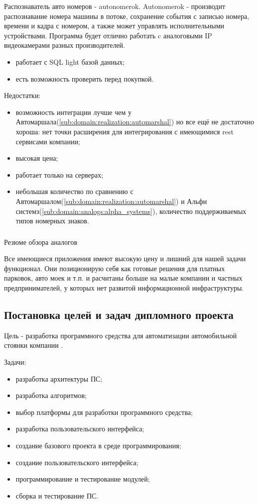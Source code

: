 Распознаватель авто номеров - autonomerok. Autonomerok - производит распознавание номера машины в потоке, сохранение события с записью номера, времени и кадра с номером, а также может управлять исполнительными устройствами. Программа будет отлично работать c аналоговыми IP видеокамерами разных производителей.
\begin{itemize}
  \item работает с SQL light базой данных;
  \item есть возможность проверить перед покупкой.
\end{itemize}
Недостатки:
\begin{itemize}
  \item возможность интеграции лучше чем у Автомаршала(\ref{sub:domain:realization:automarshal}) но все ещё не достаточно хороша: нет точки расширения для интегрирования с имеющимися rest сервисами компании;
  \item высокая цена;
  \item работает только на \windows{} серверах;
  \item небольшая количество по сравнению с Автомаршалом(\ref{sub:domain:realization:automarshal}) и Альфи системз(\ref{sub:domain:analogs:alpha_systems}), количество поддерживаемых типов номерных знаков.
\end{itemize}

\subsubsection{}
Резюме обзора аналогов

Все имеющиеся приложения имеют высокую цену и лишний для нашей задачи функционал. Они позиционирую себя как готовые решения для платных парковок, авто моек и т.п. и расчитаны больше на малые компании и частных предпринимателей, у которых нет развитой информационной инфраструктуры. 

\subsection{Постановка целей и задач дипломного проекта}
Цель - разработка программного средства для автоматизации автомобильной стоянки компании \company{}.

Задачи:
\begin{itemize}
  \item разработка архитектуры ПС;
  \item разработка алгоритмов;
  \item выбор платформы для разработки программного средства;
  \item разработка пользовательского интерфейса;
  \item создание базового проекта в среде программирования;
  \item создание пользовательского интерфейса;
  \item программирование и тестирование модулей;
  \item сборка и тестирование ПС.
\end{itemize}
